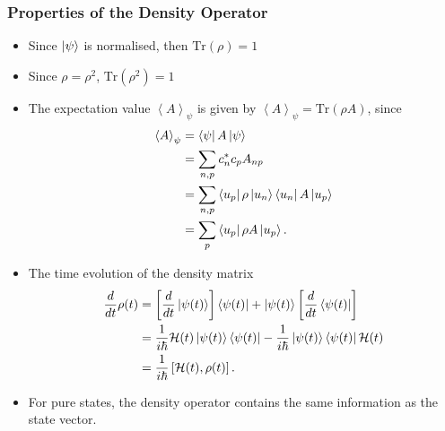 \documentclass{article}
\begin{document}
\subsubsection{Properties of the Density Operator}
\begin{itemize}
    \item Since $\ket{\psi }$ is normalised, then $\text{Tr}(\rho )=1$
    \item Since $\rho =\rho^2$, $\text{Tr}(\rho^2 )=1$
    \item The expectation value $\left\langle A \right\rangle _{\psi }$ is given by $\left\langle A \right\rangle _{\psi }=\text{Tr}(\rho A)$, since
        \begin{align*}
            \left\langle A \right\rangle_{\psi }  &= \bra{\psi }A \ket{\psi } \\
                                                  &= \sum_{n,p}c_n^*c_pA_{np} \\
                                                  &= \sum_{n,p}\bra{u_p}\rho \ket{u_n}\bra{u_n}A \ket{u_p} \\
                                                  &= \sum_{p}\bra{u_p}\rho A \ket{u_p}.
        \end{align*}
    \item The time evolution of the density matrix
        \begin{align*}
            \frac{d }{d t}\rho (t) &= \left[ \frac{d }{d t}\ket{\psi (t)} \right]\bra{\psi (t)}+\ket{\psi (t)}\left[ \frac{d }{d t}\bra{\psi (t)} \right] \\
                                   &= \frac{1}{i \hbar}\mathcal{H}(t)\ket{\psi (t)}\bra{\psi (t)}-\frac{1}{i \hbar}\ket{\psi (t)}\bra{\psi (t)}\mathcal{H}(t) \\
                                   &= \frac{1}{i \hbar}\left[ \mathcal{H}(t), \rho (t) \right].
        \end{align*}
    \item For pure states, the density operator contains the same information as the state vector.
\end{itemize}
\end{document}
